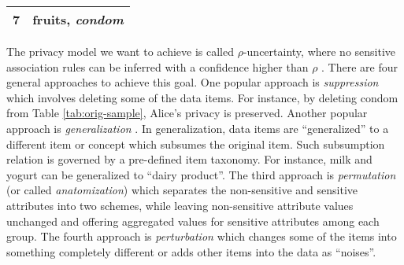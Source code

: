 \begin{table*}[th]
{\begin{tabular}{|c|l|}
7& fruits, {\em condom}  \\ \hline
\end{tabular}
\label{tab:sample3}
}
\end{table*}


The privacy model we want to achieve is called $\rho$-uncertainty, where
no sensitive association rules can be inferred with a confidence higher than
$\rho$ \cite{Cao:2010:rho}.
There are four general approaches to achieve this goal.
One popular approach is {\em suppression} \cite{Xu:2008:ATD,Cao:2010:rho}
which involves deleting some of the data items. For instance, by deleting
condom from Table \ref{tab:orig-sample}, Alice's privacy is
preserved. Another popular approach is {\em generalization}
\cite{Cao:2010:rho}. In generalization, data items are ``generalized'' to a
different item or concept which subsumes the original item. Such subsumption
relation is governed by a pre-defined item taxonomy. For instance, milk and
yogurt can be generalized to ``dairy product''. The third approach is {\em
permutation} (or called {\em anatomization})
\cite{Xiao:2006:Anatomy,2011:TKDE:Anonymous} which separates the non-sensitive
and sensitive attributes into two schemes, while leaving non-sensitive
attribute values unchanged and offering aggregated values for sensitive
attributes among each group. The
fourth approach is {\em perturbation} \cite{ChenMFDX11:Diff}
which changes some of the items into
something completely different or adds other items into the data as ``noises''.

